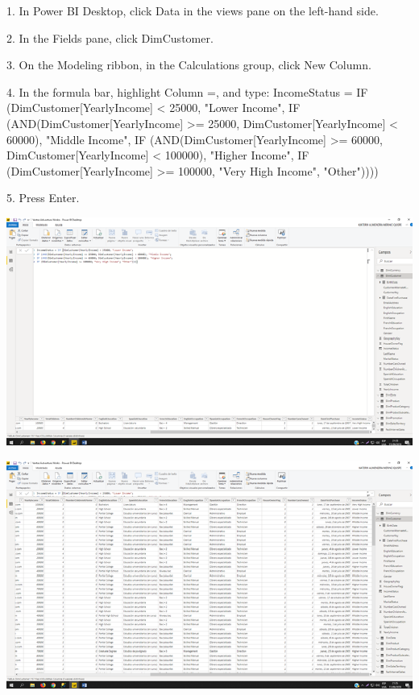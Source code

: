\item 1. In Power BI Desktop, click Data in the views pane on the left-hand side.
\item 2. In the Fields pane, click DimCustomer.
\item 3. On the Modeling ribbon, in the Calculations group, click New Column.
\item 4. In the formula bar, highlight Column =, and type:
IncomeStatus = IF (DimCustomer[YearlyIncome] < 25000, "Lower Income",
IF (AND(DimCustomer[YearlyIncome] >= 25000, DimCustomer[YearlyIncome] < 60000),
"Middle Income",
IF (AND(DimCustomer[YearlyIncome] >= 60000, DimCustomer[YearlyIncome] < 100000),
"Higher Income",
IF (DimCustomer[YearlyIncome] >= 100000, "Very High Income", "Other"))))
\item 5. Press Enter.


\begin{center}
\includegraphics[width=15cm]{./Imagenes/img23} 
\end{center}

\begin{center}
\includegraphics[width=15cm]{./Imagenes/img24} 
\end{center}

